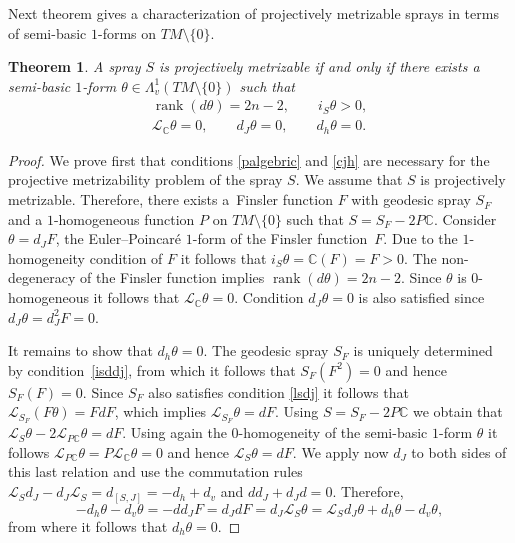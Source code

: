 \documentclass[pdftex]{sigma}
\numberwithin{equation}{section}
\newtheorem{Theorem}{Theorem}[section]
\begin{document}
Next theorem gives a characterization of projectively metrizable sprays in
terms of semi-basic $1$-forms on $TM\setminus\{0\}$.
\begin{Theorem} \label{thm:pm} A spray $S$ is projectively
metrizable if and only if there exists a semi-basic $1$-form
$\theta\in \Lambda^1_v(TM\setminus\{0\})$ such that
\begin{gather}
\operatorname{rank}\left(d\theta\right)=2n-2, \qquad i_S\theta>0,
\label{palgebric} \\ \mathcal{L}_{\mathbb{C}}\theta =0, \qquad
d_J\theta=0, \qquad d_h\theta=0. \label{cjh}\end{gather}
\end{Theorem}
\begin{proof}
We prove f\/irst that conditions \eqref{palgebric} and \eqref{cjh} are
necessary for the projective metri\-za\-bility problem of the spray $S$.
We assume that $S$ is projectively metrizable. Therefore, there
exists a~Finsler function $F$ with geodesic spray $S_F$ and a
$1$-homogeneous function $P$ on $TM\setminus\{0\}$ such that
$S=S_F-2P\mathbb{C}$. Consider $\theta=d_JF$, the Euler--Poincar\'e
$1$-form of the Finsler function~$F$. Due to the $1$-homogeneity
condition of $F$ it follows that $i_S\theta=\mathbb{C}(F)=F>0$. The non-degeneracy
of the Finsler function implies
$\operatorname{rank}\left(d\theta\right)=2n-2$. Since $\theta$ is
$0$-homogeneous it follows that
$\mathcal{L}_{\mathbb{C}}\theta=0$. Condition $d_J\theta=0$ is
also satisf\/ied since $d_J\theta=d_J^2F=0$.

It remains to show that $d_h\theta=0$. The geodesic spray $S_F$ is
uniquely determined by condi\-tion~\eqref{isddj}, from which it
follows that $S_F(F^2)=0$ and hence $S_F(F)=0$. Since $S_F$ also
satis\-f\/ies condition \eqref{lsdj} it follows that
$\mathcal{L}_{S_F}\left(F\theta\right)=FdF$, which implies
$\mathcal{L}_{S_F}\theta=dF$. Using $S=S_F-2P\mathbb{C}$ we obtain
that $\mathcal{L}_{S}\theta -2 \mathcal{L}_{P\mathbb{C}}\theta=dF$.
Using again the $0$-homogeneity of the semi-basic $1$-form $\theta$ it
follows $\mathcal{L}_{P\mathbb{C}}\theta= P
\mathcal{L}_{\mathbb{C}}\theta=0$ and hence
$\mathcal{L}_{S}\theta=dF$. We apply now $d_J$ to both sides of
this last relation and use the commutation rules
$\mathcal{L}_Sd_J-d_J\mathcal{L}_S=d_{[S,J]}=-d_{h}+d_{v}$ and
$dd_J+d_Jd=0.$ Therefore,
\[
-d_h\theta-d_v\theta=-dd_JF=d_JdF=d_J\mathcal{L}_{S}\theta=
\mathcal{L}_Sd_J\theta + d_{h}\theta- d_{v}\theta,
\] from where
it follows that $d_h\theta=0$.


\end{proof}
\end{document}
